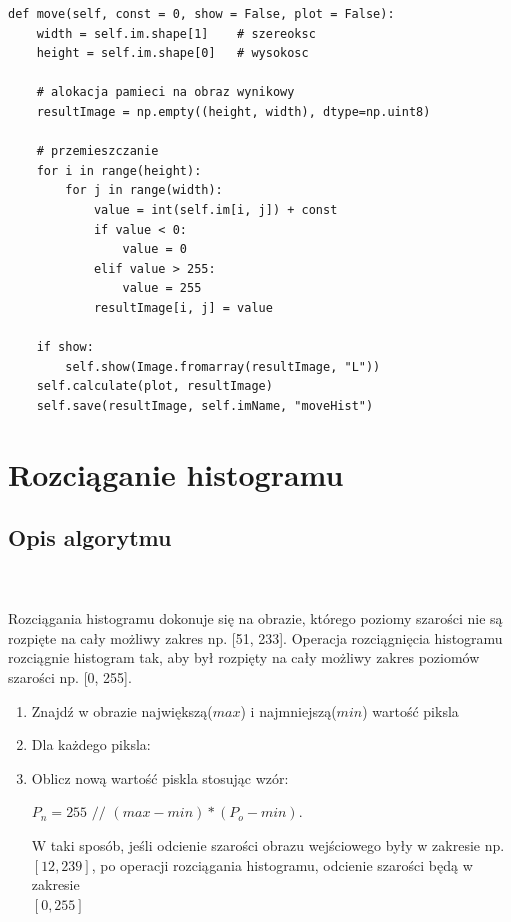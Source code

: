 \documentclass[final,a4paper,openany,12pt]{mwbk}
\begin{document}

\begin{lstlisting}[caption=Przemieszczanie histogramu]
def move(self, const = 0, show = False, plot = False):
	width = self.im.shape[1]    # szereoksc
	height = self.im.shape[0]   # wysokosc
	
	# alokacja pamieci na obraz wynikowy
	resultImage = np.empty((height, width), dtype=np.uint8)
	
	# przemieszczanie
	for i in range(height):
		for j in range(width):
			value = int(self.im[i, j]) + const
			if value < 0:
				value = 0
			elif value > 255:
				value = 255
			resultImage[i, j] = value
	
	if show:
		self.show(Image.fromarray(resultImage, "L"))
	self.calculate(plot, resultImage)
	self.save(resultImage, self.imName, "moveHist")
\end{lstlisting}

\newpage





\section{Rozciąganie histogramu}
\subsection*{Opis algorytmu}
\hfill
\\\\
\indent Rozciągania histogramu dokonuje się na obrazie, którego poziomy szarości nie są rozpięte na cały możliwy zakres np.
[51, 233]. Operacja rozciągnięcia histogramu rozciągnie histogram tak, aby był rozpięty na cały możliwy zakres poziomów szarości np. [0, 255].
\begin{enumerate}
	\item Znajdź w obrazie największą($max$) i najmniejszą($min$) wartość piksla
	\item Dla każdego piksla:
	\item Oblicz nową wartość piskla stosując wzór:\\
	\centerline{$P_n = 255$ $//$ $(max - min) * (P_o - min)$.}
	W taki sposób, jeśli odcienie szarości obrazu wejściowego były w zakresie
	np. $[12, 239]$, po operacji rozciągania histogramu, odcienie szarości będą w zakresie\\
	$[0, 255]$
\end{enumerate}
\end{document}
